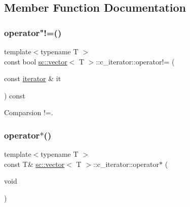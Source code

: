 \subsection{Member Function Documentation}
\mbox{\label{classsc_1_1vector_1_1c__iterator_ad8af1e7fd724bb4b61c78d672ed11003}} 
\subsubsection{\texorpdfstring{operator"!=()}{operator!=()}}
{\footnotesize\ttfamily template$<$typename T $>$ \\
const bool \hyperlink{classsc_1_1vector}{sc\+::vector}$<$ T $>$\+::c\+\_\+iterator\+::operator!= (\begin{DoxyParamCaption}\item[{const \hyperlink{classsc_1_1vector_1_1iterator}{iterator} \&}]{it }\end{DoxyParamCaption}) const\hspace{0.3cm}{\ttfamily [inline]}}



Comparsion !=. 

\mbox{\label{classsc_1_1vector_1_1c__iterator_a5ff127a4bab167a04f5e06b631f550ea}} 
\subsubsection{\texorpdfstring{operator$\ast$()}{operator*()}\hspace{0.1cm}{\footnotesize\ttfamily [1/2]}}
{\footnotesize\ttfamily template$<$typename T $>$ \\
const T\& \hyperlink{classsc_1_1vector}{sc\+::vector}$<$ T $>$\+::c\+\_\+iterator\+::operator$\ast$ (\begin{DoxyParamCaption}\item[{void}]{ }\end{DoxyParamCaption})\hspace{0.3cm}{\ttfamily [inline]}}

